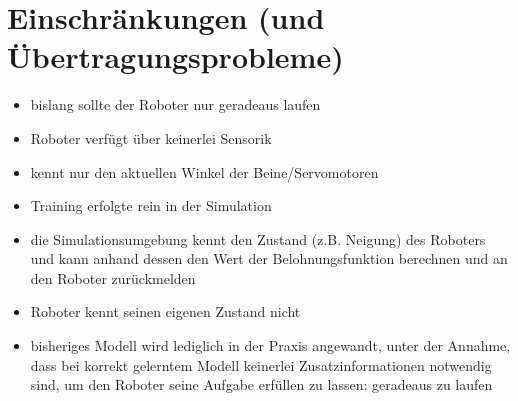 \section{Einschränkungen (und Übertragungsprobleme)}
\begin{itemize}
    \item bislang sollte der Roboter nur geradeaus laufen
    \item Roboter verfügt über keinerlei Sensorik
    \item kennt nur den aktuellen Winkel der Beine/Servomotoren
    \item Training erfolgte rein in der Simulation
    \item die Simulationsumgebung kennt den Zustand (z.B. Neigung) des Roboters und kann anhand dessen den Wert der Belohnungsfunktion berechnen und an den Roboter zurückmelden
    \item Roboter kennt seinen eigenen Zustand nicht
    \item bisheriges Modell wird lediglich in der Praxis angewandt, unter der Annahme, dass bei korrekt gelerntem Modell keinerlei Zusatzinformationen notwendig sind, um den Roboter seine Aufgabe erfüllen zu lassen: geradeaus zu laufen
\end{itemize}

